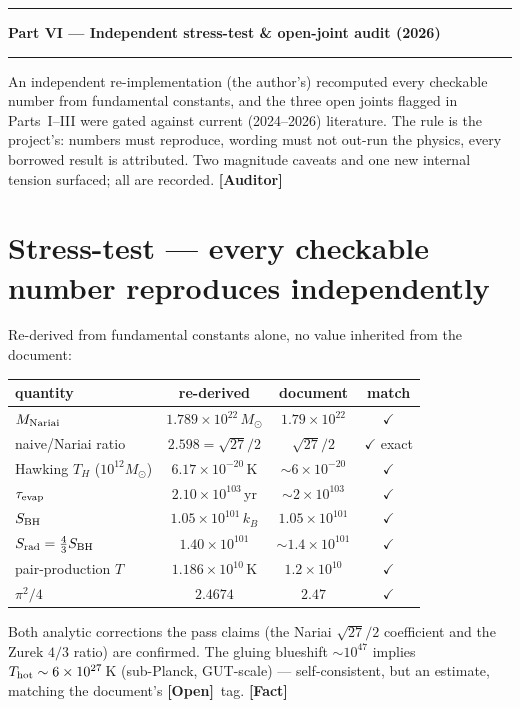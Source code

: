 \documentclass[11pt]{article}
\newcommand{\Fact}{\textbf{\textcolor{green!45!black}{[Fact]}}}
\newcommand{\Open}{\textbf{\textcolor{gray!10!black}{[Open]}}}
\newcommand{\Auditor}{\textbf{\textcolor{teal!55!black}{[Auditor]}}}
\newcommand{\msun}{M_\odot}
\begin{document}
\vspace{10pt}\hrule\vspace{2pt}
\begin{center}{\LARGE\bfseries Part VI --- Independent stress-test \& open-joint audit (2026)}\end{center}
\vspace{1pt}\hrule\vspace{5pt}
{\small An independent re-implementation (the author's) recomputed every checkable number from fundamental constants, and the three open joints flagged in Parts~I--III were gated against current (2024--2026) literature. The rule is the project's: numbers must reproduce, wording must not out-run the physics, every borrowed result is attributed. Two magnitude caveats and one new internal tension surfaced; all are recorded. \Auditor}

\section{Stress-test --- every checkable number reproduces independently}
Re-derived from fundamental constants alone, no value inherited from the document:
\begin{center}\small
\begin{tabular}{@{}lccc@{}}
\toprule
quantity & re-derived & document & match \\
\midrule
$M_{\rm Nariai}$ & $1.789\times10^{22}\,\msun$ & $1.79\times10^{22}$ & $\checkmark$ \\
naive/Nariai ratio & $2.598=\sqrt{27}/2$ & $\sqrt{27}/2$ & $\checkmark$ exact \\
Hawking $T_H$ ($10^{12}\msun$) & $6.17\times10^{-20}$\,K & $\sim6\times10^{-20}$ & $\checkmark$ \\
$\tau_{\rm evap}$ & $2.10\times10^{103}$\,yr & $\sim2\times10^{103}$ & $\checkmark$ \\
$S_{\rm BH}$ & $1.05\times10^{101}\,k_B$ & $1.05\times10^{101}$ & $\checkmark$ \\
$S_{\rm rad}=\tfrac43 S_{\rm BH}$ & $1.40\times10^{101}$ & $\sim1.4\times10^{101}$ & $\checkmark$ \\
pair-production $T$ & $1.186\times10^{10}$\,K & $1.2\times10^{10}$ & $\checkmark$ \\
$\pi^2/4$ & $2.4674$ & $2.47$ & $\checkmark$ \\
\bottomrule
\end{tabular}
\end{center}
Both analytic corrections the pass claims (the Nariai $\sqrt{27}/2$ coefficient and the Zurek $4/3$ ratio) are confirmed. The gluing blueshift $\sim10^{47}$ implies $T_{\rm hot}\sim6\times10^{27}$\,K (sub-Planck, GUT-scale) --- self-consistent, but an estimate, matching the document's \Open\ tag. \Fact
\end{document}
